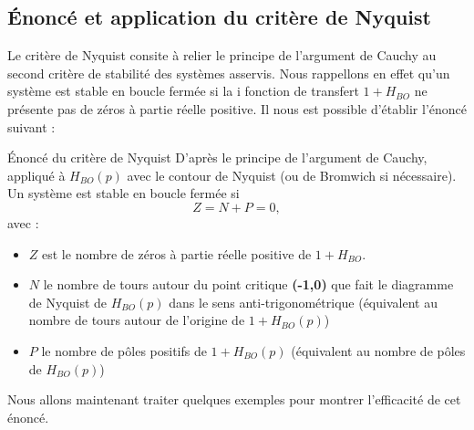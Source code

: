 \subsection{\'Enoncé et application du critère de Nyquist}
Le critère de Nyquist consite à relier le principe de l'argument de Cauchy au 
second critère de stabilité des systèmes asservis\label{critere2}.
Nous rappellons en effet qu'un système est stable en boucle fermée si la i
fonction de transfert $1+H_{BO}$ ne présente pas de zéros à partie réelle 
positive. Il nous est possible d'établir l'énoncé suivant :
\begin{theorem}{\'Enoncé du critère de Nyquist
    } 
D'après le principe de l'argument de Cauchy, appliqué à $H_{BO}(p)$ avec le 
contour de Nyquist (ou de Bromwich si nécessaire). Un système est stable en 
boucle fermée si 
\[
    Z=N+P=0,
\]
avec :
\begin{itemize}
    \item $Z$ est le nombre de zéros à partie réelle positive de $1+H_{BO}$.  
    \item $N$ le nombre de tours autour du point critique \textbf{(-1,0)} que 
          fait le diagramme de Nyquist de $H_{BO}(p)$ dans le sens 
          anti-trigonométrique
          (équivalent au nombre de tours autour de l'origine de $1+H_{BO}(p)$)
    \item $P$ le nombre de pôles positifs de $1+H_{BO}(p)$ (équivalent au 
          nombre de pôles de $H_{BO}(p)$)
\end{itemize}
\end{theorem}
Nous allons maintenant traiter quelques exemples pour montrer l'efficacité
de cet énoncé.
